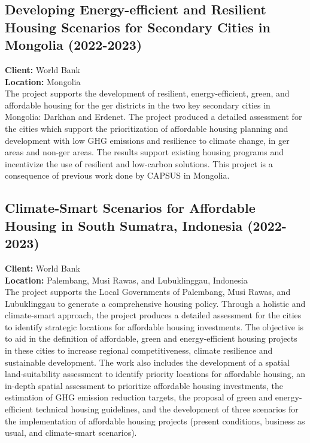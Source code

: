 \documentclass[
	a4paper,
	12pt,
	unnumberedsections,
]{CSSullivanBusinessReport}
\begin{document}
\subsection{Developing Energy-efficient and Resilient Housing Scenarios for Secondary Cities in Mongolia (2022-2023)}
\textbf{Client:}  World Bank \\
\textbf{Location:}  Mongolia \\[0.5em]
 The project supports the development of resilient, energy-efficient, green, and affordable housing for the ger districts in the two key secondary cities in Mongolia: Darkhan and Erdenet. The project produced a detailed assessment for the cities which support the prioritization of affordable housing planning and development with low GHG emissions and resilience to climate change, in ger areas and non-ger areas. The results support existing housing programs and incentivize the use of resilient and low-carbon solutions. This project is a consequence of previous work done by CAPSUS in Mongolia.

\subsection{Climate-Smart Scenarios for Affordable Housing in South Sumatra, Indonesia (2022-2023)}
\textbf{Client:}  World Bank \\
\textbf{Location:}  Palembang, Musi Rawas, and Lubuklinggau, Indonesia \\[0.5em]
 The project supports the Local Governments of Palembang, Musi Rawas, and Lubuklinggau to generate a comprehensive housing policy. Through a holistic and climate-smart approach, the project produces a detailed assessment for the cities to identify strategic locations for affordable housing investments. The objective is to aid in the definition of affordable, green and energy-efficient housing projects in these cities to increase regional competitiveness, climate resilience and sustainable development. The work also includes the development of a spatial land-suitability assessment to identify priority locations for affordable housing, an in-depth spatial assessment to prioritize affordable housing investments, the estimation of GHG emission reduction targets, the proposal of green and energy-efficient technical housing guidelines, and the development of three scenarios for the implementation of affordable housing projects (present conditions, business as usual, and climate-smart scenarios).
\end{document}
